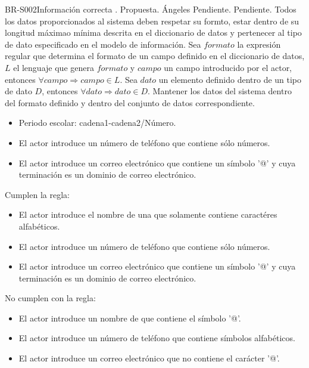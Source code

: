 \begin{BusinessRule}{BR-S002}{Información correcta}
	{\bcIntegridad}    %
	{\btEnabler}     %
	{\blControlling}    %
	.
	\BRItem[Estado] Propuesta.
	 Ángeles
	 Pendiente.
	 Pendiente.
	\BRItem[Descripción] Todos los datos proporcionados al sistema deben respetar su formto, estar dentro de su longitud máximao mínima descrita en el diccionario de datos y pertenecer al tipo de dato especificado en el modelo de información.
	\BRItem[Sentencia] Sea $formato$ la expresión regular que determina el formato de un campo definido en el diccionario de datos, $L$ el lenguaje que genera $formato$ y $campo$ un campo introducido por el actor, entonces $ \forall campo \Rightarrow campo \in L $.
	\BRItem[Sentencia] Sea $dato$ un elemento definido dentro de un tipo de dato $D$, entonces $ \forall dato \Rightarrow dato \in D $.
	\BRItem[Motivación] Mantener los datos del sistema dentro del formato definido y dentro del conjunto de datos correspondiente.

	\begin{itemize}
		\item Periodo escolar: cadena1-cadena2/Número.
		\item El actor introduce un número de teléfono que contiene sólo números.
		\item El actor introduce un correo electrónico que contiene un símbolo '@' y cuya terminación es un dominio de correo electrónico.
	\end{itemize}


	 Cumplen la regla:
	\begin{itemize}
		\item El actor introduce el nombre de una  que solamente contiene caractéres alfabéticos.
		\item El actor introduce un número de teléfono que contiene sólo números.
		\item El actor introduce un correo electrónico que contiene un símbolo '@' y cuya terminación es un dominio de correo electrónico.
	\end{itemize}
	 No cumplen con la regla:
	\begin{itemize}
		\item El actor introduce un nombre de  que contiene el símbolo '@'.
		\item El actor introduce un número de teléfono que contiene símbolos alfabéticos.
		\item El actor introduce un correo electrónico que no contiene el carácter '@'.
	\end{itemize}


\end{BusinessRule}

